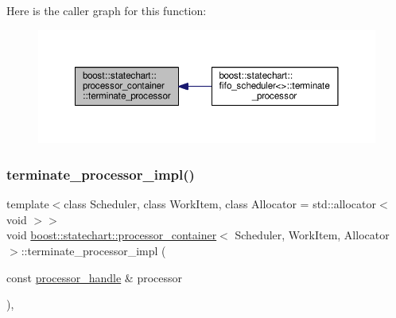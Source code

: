 Here is the caller graph for this function\+:
\nopagebreak
\begin{figure}[H]
\begin{center}
\leavevmode
\includegraphics[width=350pt]{classboost_1_1statechart_1_1processor__container_aaf9ad46333b3d8f490769788ced131a2_icgraph}
\end{center}
\end{figure}
\mbox{\label{classboost_1_1statechart_1_1processor__container_a883cf537f7ae021aa79c8614f993f442}} 
\subsubsection{\texorpdfstring{terminate\+\_\+processor\+\_\+impl()}{terminate\_processor\_impl()}}
{\footnotesize\ttfamily template$<$class Scheduler, class Work\+Item, class Allocator = std\+::allocator$<$ void $>$$>$ \\
void \mbox{\hyperlink{classboost_1_1statechart_1_1processor__container}{boost\+::statechart\+::processor\+\_\+container}}$<$ Scheduler, Work\+Item, Allocator $>$\+::terminate\+\_\+processor\+\_\+impl (\begin{DoxyParamCaption}\item[{const \mbox{\hyperlink{classboost_1_1statechart_1_1processor__container_a82ebbffaed81d7b99119ae0e892f6411}{processor\+\_\+handle}} \&}]{processor }\end{DoxyParamCaption})\hspace{0.3cm}{\ttfamily [inline]}, {\ttfamily [private]}}

